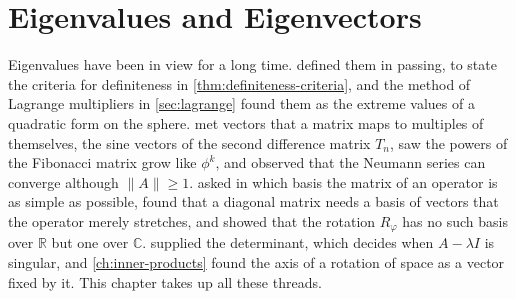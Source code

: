 \chapter{Eigenvalues and Eigenvectors}
\label{ch:eigenvalues}


Eigenvalues have been in view for a long time.  defined them in passing, to state the criteria for definiteness in \cref{thm:definiteness-criteria}, and the method of Lagrange multipliers in \cref{sec:lagrange} found them as the extreme values of a quadratic form on the sphere.  met vectors that a matrix maps to multiples of themselves, the sine vectors of the second difference matrix $T_n$, saw the powers of the Fibonacci matrix grow like $\phi^k$, and observed that the Neumann series can converge although $\|A\|\ge1$.  asked in which basis the matrix of an operator is as simple as possible, found that a diagonal matrix needs a basis of vectors that the operator merely stretches, and showed that the rotation $R_\varphi$ has no such basis over $\mathbb R$ but one over $\mathbb C$.  supplied the determinant, which decides when $A-\lambda I$ is singular, and \cref{ch:inner-products} found the axis of a rotation of space as a vector fixed by it. This chapter takes up all these threads.

